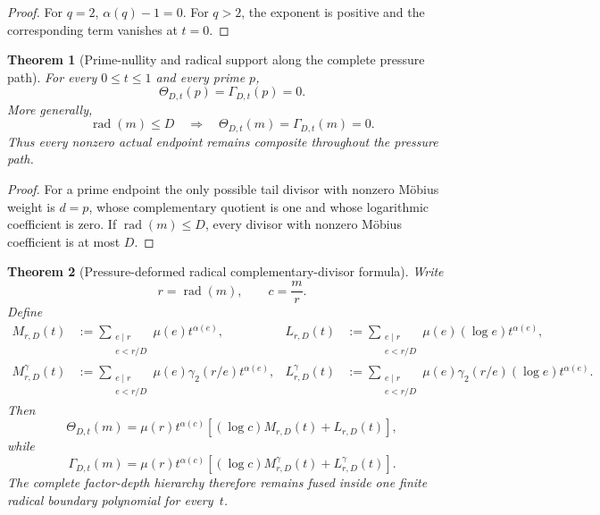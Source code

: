 \documentclass[11pt]{article}
\newtheorem{theorem}{Theorem}[section]
\theoremstyle{definition}
\theoremstyle{remark}
\newcommand{\rad}{\operatorname{rad}}
\begin{document}
\begin{proof}
For $q=2$, $\alpha(q)-1=0$.  For $q>2$, the exponent is positive and the
corresponding term vanishes at $t=0$.
\end{proof}

\begin{theorem}[Prime-nullity and radical support along the complete pressure path]
\label{thm:affpress-pressure-prime-null}
For every $0\le t\le1$ and every prime $p$,
\begin{equation}
 \label{eq:affpress-pressure-prime-null}
 \boxed{
 \Theta_{D,t}(p)=\Gamma_{D,t}(p)=0.}
 \tag{P.8}
\end{equation}
More generally,
\begin{equation}
 \label{eq:affpress-pressure-radical-null}
 \boxed{
 \rad(m)\le D
 \quad\Longrightarrow\quad
 \Theta_{D,t}(m)=\Gamma_{D,t}(m)=0.}
 \tag{P.9}
\end{equation}
Thus every nonzero actual endpoint remains composite throughout the pressure
path.
\end{theorem}

\begin{proof}
For a prime endpoint the only possible tail divisor with nonzero M\"obius
weight is $d=p$, whose complementary quotient is one and whose logarithmic
coefficient is zero.  If $\rad(m)\le D$, every divisor with nonzero M\"obius
coefficient is at most $D$.
\end{proof}

\begin{theorem}[Pressure-deformed radical complementary-divisor formula]
\label{thm:affpress-radical-pressure}
Write
\[
 r=\rad(m),
 \qquad
 c=\frac mr.
\]
Define
\[
 \begin{aligned}
 M_{r,D}(t)
 &:=\sum_{\substack{e\mid r\\e<r/D}}
     \mu(e)t^{\alpha(e)},
 &
 L_{r,D}(t)
 &:=\sum_{\substack{e\mid r\\e<r/D}}
     \mu(e)(\log e)t^{\alpha(e)},\\
 M_{r,D}^{\gamma}(t)
 &:=\sum_{\substack{e\mid r\\e<r/D}}
     \mu(e)\gamma_2(r/e)t^{\alpha(e)},
 &
 L_{r,D}^{\gamma}(t)
 &:=\sum_{\substack{e\mid r\\e<r/D}}
     \mu(e)\gamma_2(r/e)(\log e)t^{\alpha(e)}.
 \end{aligned}
\]
Then
\begin{equation}
 \label{eq:affpress-radical-pressure-actual}
 \boxed{
 \Theta_{D,t}(m)
 =\mu(r)t^{\alpha(c)}
 \left[
  (\log c)M_{r,D}(t)+L_{r,D}(t)
 \right],}
 \tag{P.10}
\end{equation}
while
\begin{equation}
 \label{eq:affpress-radical-pressure-local}
 \boxed{
 \Gamma_{D,t}(m)
 =\mu(r)t^{\alpha(c)}
 \left[
  (\log c)M_{r,D}^{\gamma}(t)
  +L_{r,D}^{\gamma}(t)
 \right].}
 \tag{P.11}
\end{equation}
The complete factor-depth hierarchy therefore remains fused inside one
finite radical boundary polynomial for every~$t$.
\end{theorem}
\end{document}
